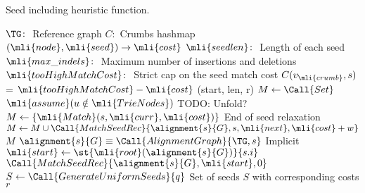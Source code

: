 \begin{algorithm}[t]
	\caption{Seed including heuristic function.}\label{alg:precompute}
	\begin{algorithmic}[1]
		\State $\TG\colon$ Reference graph \label{lin:reference}
		\State $C\colon$ Crumbs hashmap $(\mli{node}, \mli{seed}) \to \mli{cost}$
        \State $\mli{seedlen}\colon$ Length of each seed
		\State $\mli{max\_indels}\colon$ Maximum number of insertions and deletions
		\State $\mli{tooHighMatchCost}\colon$ Strict cap on the seed match cost
		\Statex
            \State $C(v_\mli{crumb},s)$ = $\mli{tooHighMatchCost} - \mli{cost}$
		\EndFunction
		\Statex
            \State {}
			\Comment (start, len, r)
		\EndFunction
		\Statex
			\State $M \gets \Call{Set}$
				\State $\mli{assume}(u \notin \mli{TrieNodes})$
				\Comment TODO: Unfold?
				\State $M \gets \{ \mli{Match}(s, \mli{curr}, \mli{cost})\}$
				\Comment End of seed relaxation
			\Else
						\State $M \gets M \cup \Call{MatchSeedRec}{\alignment{s}{G}, s, \mli{next}, \mli{cost} + w}$
					\EndIf
				\EndFor
			\EndIf
			\State \Return $M$
		\EndFunction
		\Statex
			\State $\alignment{s}{G} \equiv \Call{AlignmentGraph}{\TG, s}$
			\Comment Implicit
			\State $\mli{start} \gets \st{\mli{root}(\alignment{s}{G})}{s.i}$
			\State \Return $\Call{MatchSeedRec}{\alignment{s}{G}, \mli{start}, 0}$
		\EndFunction
		\Statex
		 \label{lin:process_seeds}
			\State $S \gets \Call{GenerateUniformSeeds}{q}$
			\Comment Set of seeds $S$ with corresponding costs $r$


\end{algorithmic}
\end{algorithm}
